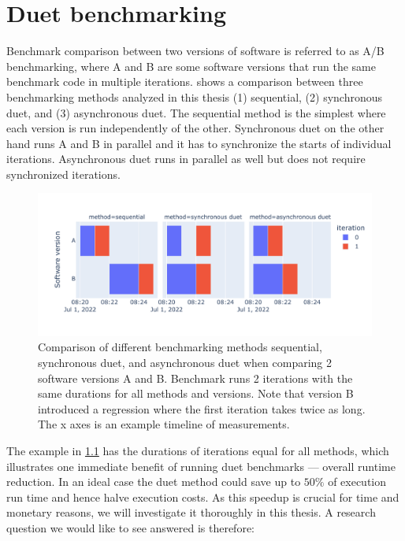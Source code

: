 \chapter{Duet benchmarking}
\label{chap:duet}

Benchmark comparison between two versions of software is referred to as A/B benchmarking, where A and B are some software versions that run the same benchmark code in multiple iterations.
 shows a comparison between three benchmarking methods analyzed in this thesis (1) sequential, (2) synchronous duet, and (3) asynchronous duet.
The sequential method is the simplest where each version is run independently of the other.
Synchronous duet on the other hand runs A and B in parallel and it has to synchronize the starts of individual iterations.
Asynchronous duet runs in parallel as well but does not require synchronized iterations.

\begin{figure}
	\centering
	\includegraphics[width=.9\linewidth]{./figures/method_timeline.pdf}
	\caption{
	Comparison of different benchmarking methods sequential, synchronous duet, and asynchronous duet when comparing 2 software versions A and B.
	Benchmark runs 2 iterations with the same durations for all methods and versions.
	Note that version B introduced a regression where the first iteration takes twice as long.
	The x axes is an example timeline of measurements.
	}
	\label{fig:method_timeline}
\end{figure}

The example in \cref{fig:method_timeline} has the durations of iterations equal for all methods, which illustrates one immediate benefit of running duet benchmarks --- overall runtime reduction.
In an ideal case the duet method could save up to $50\%$ of execution run time and hence halve execution costs.
As this speedup is crucial for time and monetary reasons, we will investigate it thoroughly in this thesis.
A research question we would like to see answered is therefore:

